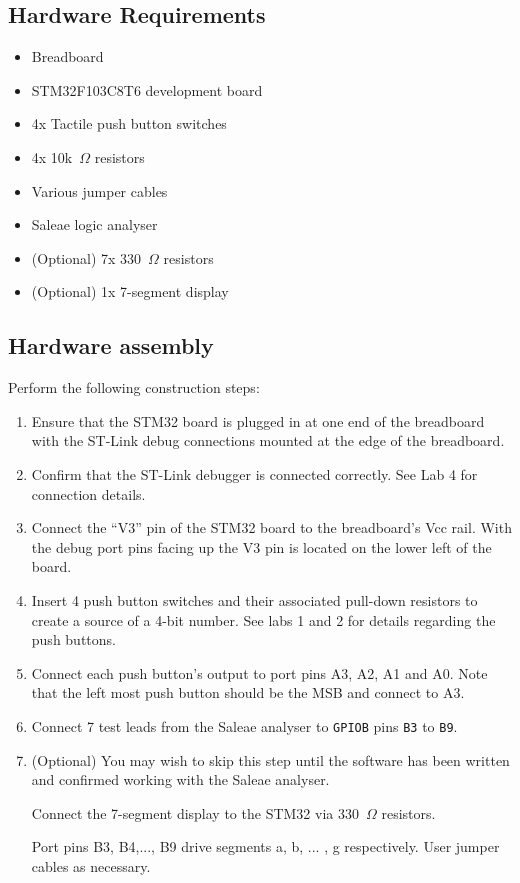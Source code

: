 \documentclass{UoNMCHA}
\numberwithin{equation}{section}
\begin{document}
\subsection{Hardware Requirements}

\begin{itemize}
    \item Breadboard
    \item STM32F103C8T6 development board
    \item 4x Tactile push button switches
    \item 4x 10k~$\Omega$ resistors
    \item Various jumper cables
    \item Saleae logic analyser
    \item (Optional) 7x 330~$\Omega$ resistors
    \item (Optional) 1x 7-segment display
\end{itemize}

\subsection{Hardware assembly}

Perform the following construction steps:

\begin{enumerate}
    \item Ensure that the STM32 board is plugged in at one end of the breadboard with the ST-Link debug connections mounted at the edge of the breadboard.
    \item Confirm that the ST-Link debugger is connected correctly. See Lab 4 for connection details.
    \item Connect the ``V3'' pin of the STM32 board to the breadboard's Vcc rail. With the debug port pins facing up the V3 pin is located on the lower left of the board.
    \item Insert 4 push button switches and their associated pull-down resistors to create a source of a 4-bit number. See labs 1 and 2 for details regarding the push buttons.
    \item Connect each push button's output to port pins A3, A2, A1 and A0. Note that the left most push button should be the MSB and connect to A3.
    \item Connect 7 test leads from the Saleae analyser to \texttt{GPIOB} pins \texttt{B3} to \texttt{B9}.
    \item (Optional) You may wish to skip this step until the software has been written and confirmed working with the Saleae analyser.
    
    Connect the 7-segment display to the STM32 via 330~$\Omega$ resistors.
    
    Port pins B3, B4,..., B9 drive segments a, b, ... , g respectively. User jumper cables as necessary.
    

\end{enumerate}
\end{document}
